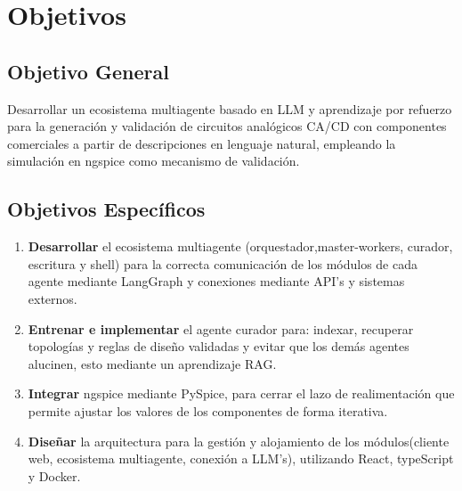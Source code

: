 \section*{Objetivos}

\subsection*{Objetivo General}
Desarrollar un ecosistema multiagente basado en LLM y aprendizaje por refuerzo para la generación y validación de circuitos analógicos CA/CD con componentes comerciales a partir de descripciones en lenguaje natural, empleando la simulación en ngspice como mecanismo de validación.

\subsection*{Objetivos Específicos}
\begin{enumerate}
    
    \item \textbf{Desarrollar} el ecosistema multiagente (orquestador,master-workers, curador, escritura y shell) para la correcta comunicación de los módulos de cada agente mediante LangGraph y conexiones mediante API’s y sistemas externos.
    
    \item \textbf{Entrenar e implementar} el agente curador para: indexar, recuperar topologías y reglas de diseño validadas y evitar que los demás agentes alucinen, esto mediante un aprendizaje RAG.

    \item \textbf{Integrar} ngspice mediante PySpice, para cerrar el lazo de realimentación que permite ajustar los valores de los componentes de forma iterativa.
    \item \textbf{Diseñar} la arquitectura para la gestión y alojamiento de los módulos(cliente web, ecosistema multiagente, conexión a LLM’s), utilizando React, typeScript y Docker.
    
    







\end{enumerate}